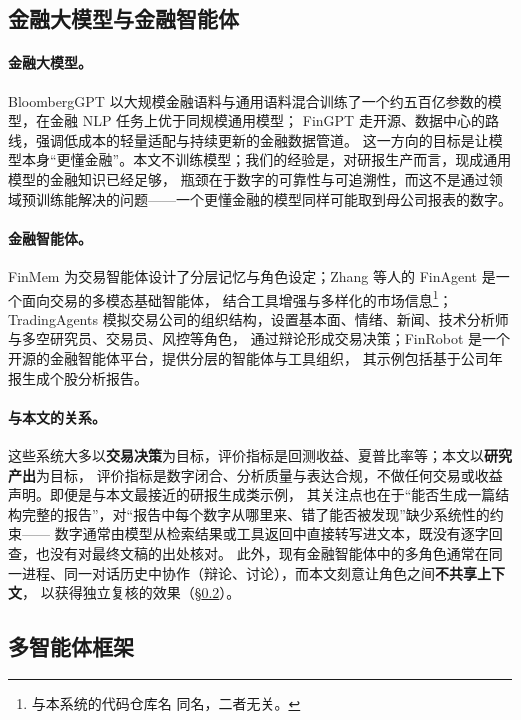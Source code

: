 \subsection{金融大模型与金融智能体}
\label{sec:rel-finagents}

\paragraph{金融大模型。}
BloombergGPT\cite{wu2023bloomberggpt} 以大规模金融语料与通用语料混合训练了一个约五百亿参数的模型，在金融 NLP 任务上优于同规模通用模型；
FinGPT\cite{yang2023fingpt} 走开源、数据中心的路线，强调低成本的轻量适配与持续更新的金融数据管道。
这一方向的目标是让模型本身“更懂金融”。本文不训练模型；我们的经验是，对研报生产而言，现成通用模型的金融知识已经足够，
瓶颈在于数字的可靠性与可追溯性，而这不是通过领域预训练能解决的问题——一个更懂金融的模型同样可能取到母公司报表的数字。

\paragraph{金融智能体。}
FinMem\cite{yu2023finmem} 为交易智能体设计了分层记忆与角色设定；Zhang 等人的 FinAgent\cite{zhang2024finagent} 是一个面向交易的多模态基础智能体，
结合工具增强与多样化的市场信息\footnote{与本系统的代码仓库名  同名，二者无关。}；
TradingAgents\cite{xiao2024tradingagents} 模拟交易公司的组织结构，设置基本面、情绪、新闻、技术分析师与多空研究员、交易员、风控等角色，
通过辩论形成交易决策；FinRobot\cite{yang2024finrobot} 是一个开源的金融智能体平台，提供分层的智能体与工具组织，
其示例包括基于公司年报生成个股分析报告。

\paragraph{与本文的关系。}
这些系统大多以\textbf{交易决策}为目标，评价指标是回测收益、夏普比率等；本文以\textbf{研究产出}为目标，
评价指标是数字闭合、分析质量与表达合规，不做任何交易或收益声明。即便是与本文最接近的研报生成类示例，
其关注点也在于“能否生成一篇结构完整的报告”，对“报告中每个数字从哪里来、错了能否被发现”缺少系统性的约束——
数字通常由模型从检索结果或工具返回中直接转写进文本，既没有逐字回查，也没有对最终文稿的出处核对。
此外，现有金融智能体中的多角色通常在同一进程、同一对话历史中协作（辩论、讨论），而本文刻意让角色之间\textbf{不共享上下文}，
以获得独立复核的效果（\S\ref{sec:rel-multiagent}）。

\subsection{多智能体框架}
\label{sec:rel-multiagent}

